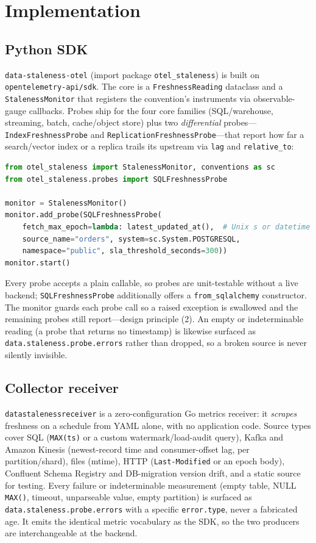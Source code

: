 \documentclass[11pt]{article}
\begin{document}
\section{Implementation}
\label{sec:impl}

\subsection{Python SDK}
\texttt{data-staleness-otel} (import package \texttt{otel\_staleness}) is built on \texttt{opentelemetry-api/sdk}. The core is
a \texttt{FreshnessReading} dataclass and a \texttt{StalenessMonitor} that
registers the convention's instruments via observable-gauge callbacks. Probes
ship for the four core families (SQL/warehouse, streaming, batch, cache/object
store) plus two \emph{differential} probes---\texttt{IndexFreshnessProbe} and
\texttt{ReplicationFreshnessProbe}---that report how far a search/vector index or
a replica trails its upstream via \texttt{lag} and \texttt{relative\_to}:

\begin{lstlisting}[language=Python]
from otel_staleness import StalenessMonitor, conventions as sc
from otel_staleness.probes import SQLFreshnessProbe

monitor = StalenessMonitor()
monitor.add_probe(SQLFreshnessProbe(
    fetch_max_epoch=lambda: latest_updated_at(),  # Unix s or datetime
    source_name="orders", system=sc.System.POSTGRESQL,
    namespace="public", sla_threshold_seconds=300))
monitor.start()
\end{lstlisting}

Every probe accepts a plain callable, so probes are unit-testable without a live
backend; \texttt{SQLFreshnessProbe} additionally offers a \texttt{from\_sqlalchemy}
constructor. The monitor guards each probe call so a raised exception is
swallowed and the remaining probes still report---design principle (2). An
empty or indeterminable reading (a probe that returns no timestamp) is likewise
surfaced as \texttt{data.staleness.probe.errors} rather than dropped, so a broken
source is never silently invisible.

\subsection{Collector receiver}
\texttt{datastalenessreceiver} is a zero-configuration Go metrics receiver: it
\emph{scrapes} freshness on a schedule from YAML alone, with no application code.
Source types cover SQL (\texttt{MAX(ts)} or a custom watermark/load-audit query),
Kafka and Amazon Kinesis (newest-record time and consumer-offset lag, per
partition/shard), files (mtime), HTTP (\texttt{Last-Modified} or an epoch body),
Confluent Schema Registry and DB-migration version drift, and a static source for
testing. Every failure or indeterminable measurement (empty table, NULL
\texttt{MAX()}, timeout, unparseable value, empty partition) is surfaced as
\texttt{data.staleness.probe.errors} with a specific \texttt{error.type}, never a
fabricated age. It emits the identical metric vocabulary as the SDK, so the two
producers are interchangeable at the backend.
\end{document}
